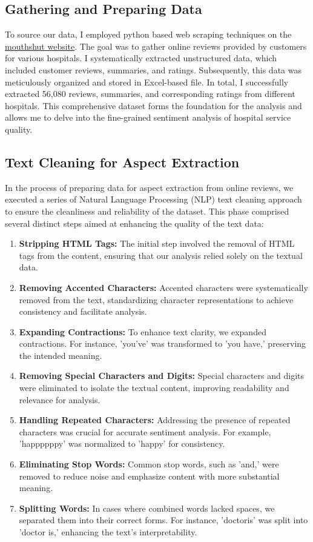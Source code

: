 \subsection{Gathering and Preparing Data}
To source our data, I employed python based web scraping techniques on the \href{www.mouthshut.com}{mouthshut website}. The goal was to gather online reviews provided by customers for various hospitals. I systematically extracted unstructured data, which included customer reviews, summaries, and ratings. Subsequently, this data was meticulously organized and stored in Excel-based file. In total, I successfully extracted 56,080 reviews, summaries, and corresponding ratings from different hospitals. This comprehensive dataset forms the foundation for the analysis and allows me to delve into the fine-grained sentiment analysis of hospital service quality.
\subsection{Text Cleaning for Aspect Extraction}
In the process of preparing data for aspect extraction from online reviews, we executed a series of Natural Language Processing (NLP) text cleaning approach to ensure the cleanliness and reliability of the dataset. This phase comprised several distinct steps aimed at enhancing the quality of the text data:
\begin{enumerate}
    \item \textbf{Stripping HTML Tags:} The initial step involved the removal of HTML tags from the content, ensuring that our analysis relied solely on the textual data.
    
    \item \textbf{Removing Accented Characters:} Accented characters were systematically removed from the text, standardizing character representations to achieve consistency and facilitate analysis.
    
    \item \textbf{Expanding Contractions:} To enhance text clarity, we expanded contractions. For instance, 'you've' was transformed to 'you have,' preserving the intended meaning.
    
    \item \textbf{Removing Special Characters and Digits:} Special characters and digits were eliminated to isolate the textual content, improving readability and relevance for analysis.
    
    \item \textbf{Handling Repeated Characters:} Addressing the presence of repeated characters was crucial for accurate sentiment analysis. For example, 'happppppy' was normalized to 'happy' for consistency.
    
    \item \textbf{Eliminating Stop Words:} Common stop words, such as 'and,' were removed to reduce noise and emphasize content with more substantial meaning.
    
    \item \textbf{Splitting Words:} In cases where combined words lacked spaces, we separated them into their correct forms. For instance, 'doctoris' was split into 'doctor is,' enhancing the text's interpretability.
\end{enumerate}
